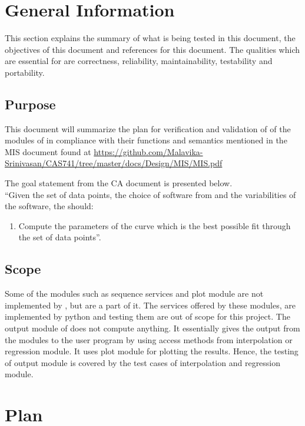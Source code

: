 \documentclass[12pt, titlepage]{article}
\begin{document}
\section{General Information}

This section explains the summary of what is being tested in this document, the 
objectives of this document and references for this document. The qualities 
which are essential for \famname{} are correctness, reliability, 
maintainability, testability and portability.


\subsection{Purpose}

This document will summarize the plan for verification and validation of
of the modules of \famname{} in compliance with their functions and semantics 
mentioned in the MIS document found at 
\url{https://github.com/Malavika-Srinivasan/CAS741/tree/master/docs/Design/MIS/MIS.pdf}

The goal statement from the CA document is presented below.\\
\noindent ``Given the set of data points, the choice of software from 
\famname{} and the variabilities of the software, the \famname{} should:

\begin{enumerate}
	
	\item Compute the parameters of the curve which is the best possible fit 
	through the set of data points''.
\end{enumerate}


\subsection{Scope}

Some of the modules such as sequence services and plot module are not 
implemented by \famname{}, but are a part of it. The services offered by these 
modules, are implemented by python and testing them are out of scope for this 
project.
The output module of \famname{} does not compute anything. It essentially gives 
the output from the modules to the user program by using access methods from 
interpolation or regression module. It uses plot module for plotting the 
results. Hence, the testing of output module is covered by the test cases of 
interpolation and regression module.

\section{Plan}
\end{document}

